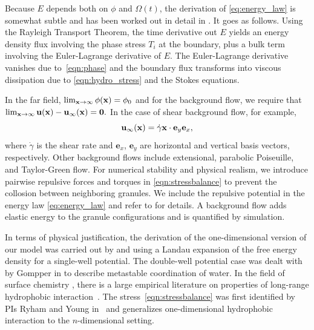 Because $E$ depends both on $\phi$ and $\Omega(t)$,
the derivation of \eqref{eq:energy_law}
is somewhat subtle and has been worked out in detail in \cite{Fu2018_SIAM}.
It goes as follows.
Using the Rayleigh Transport Theorem, 
the time derivative out $E$ yields an energy
density flux involving the phase stress $T_i$
at the boundary, plus a bulk term involving 
the Euler-Lagrange derivative of $E.$
The Euler-Lagrange derivative vanishes due to~\eqref{eqn:phase}
and the boundary flux transforms into viscous dissipation due to 
\eqref{eqn:hydro_stress} and the Stokes equations. 

In the far field, $\lim_{\mathbf{x} \to \infty} \phi(\mathbf{x}) = \phi_0$
and for the background flow, we require that
$\lim_{\mathbf{x} \to \infty} \mathbf{u}(\mathbf{x}) - \mathbf{u}_{\infty}(\mathbf{x}) = \mathbf{0}.$ 
In the case of shear background flow, for example,
\begin{equation}
\label{eqn:shear_BG_flow}
\mathbf{u}_{\infty}(\mathbf{x}) = \dot{\gamma} \mathbf{x} \cdot \mathbf{e}_y \mathbf{e}_x,
\end{equation}
where $\dot \gamma$ is the shear rate and
$\mathbf{e}_x$, $\mathbf{e}_y$ are horizontal and vertical
basis vectors, respectively.  Other background flows include
extensional, parabolic Poiseuille, and Taylor-Green flow.
For numerical stability and physical realism,
we introduce pairwise repulsive forces and torques in \eqref{eqn:stressbalance}
to prevent the collosion between neighboring granules.
We include the repulsive potential in the energy law \eqref{eq:energy_law} 
and refer to \cite{FuQuRyYo22,fu-ryh-qua-you2022,Fu2018_SIAM} for details.
A background flow adds elastic energy to the granule configurations
and is quantified by simulation.

In terms of physical justification, the
derivation of the one-dimensional version of our model
was carried out by \cite{MaRa76} and \cite{ErLjCl89}
using a Landau expansion of the
free energy density for a single-well potential.
The double-well potential case was dealt with by
Gompper in \cite{GoHaKo94} to describe metastable coordination of water.
In the field of surface chemistry \cite{Israelachvili1954},
there is a large empirical literature on properties of
long-range hydrophobic interaction~\cite{LeRaPa77,KoNa15,
Nagle17,Lum1999, Lin2005, Meyer2006, Ducker2016,Jackson2016,Gletal88,Aketal17,Ch05}.
The stress~\eqref{eqn:stressbalance} was first
identified by PIs Ryham and Young in~\cite{Fu2018_SIAM}
and generalizes one-dimensional hydrophobic interaction to
the $n$-dimensional setting. 

